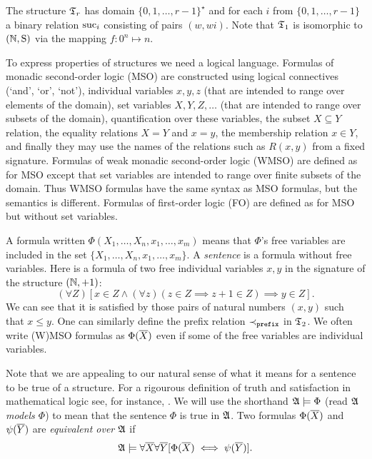 \begin{example}
The structure  $\mathfrak{T}_r$ has domain $\{0,1, \dots,r-1\}^\star$ and for each  $i$ from $\{0,1, \dots, r-1\}$ a binary relation $\text{suc}_i$ consisting of pairs $(w,wi)$. 
Note that $\mathfrak{T}_1$ is isomorphic to $\mbox{$(\mathbb{N},\mathrm{S})$}$ via the mapping $f:0^n \mapsto n$.
\end{example}

To express properties of structures we need a logical language. Formulas of monadic
second-order logic (MSO) are constructed using logical connectives (`and',
`or', `not'), individual variables $x,y,z$ (that are intended to range over
elements of the domain), set variables $X,Y,Z,\dots$ (that are intended to
range over subsets of the domain), quantification over these variables, the
subset $X \subseteq Y$ relation, the equality relations $X = Y$ and $x=y$, the membership relation $x \in Y$, 
and finally they may
use the names of the relations such as $R(x,y)$ from a fixed signature. 
Formulas of weak monadic second-order logic (WMSO) are defined as for MSO
except that set variables are intended to range over finite subsets of the
domain. Thus WMSO formulas have the same syntax as MSO formulas, but the semantics is different.
Formulas of first-order logic (FO) are defined as for MSO but without 
set variables. 

A formula written $\Phi(X_1,\dots,X_n,x_1,\dots,x_m)$ means that $\Phi$'s
free variables are included in the set $\{X_1,\dots,X_n,x_1,\dots,x_m\}$.
A {\em sentence} is a formula without free variables. 
Here is a formula of two free individual variables $x,y$ in the signature of the structure $(\mathbb{N},+1)$:
\[
(\forall Z) [x \in Z \wedge (\forall z)(z \in Z \implies z+1 \in Z) \implies y \in Z].
\]
We can see that it is satisfied by those pairs of natural numbers $(x,y)$ such that $x \leq y$. 
One can similarly define the prefix relation $\prec_{\tt prefix}$ in $\mathfrak{T}_2$. We often write (W)MSO formulas as $\Phi(\mbox{$\overline {X}$})$ even if some of the free
variables are individual variables.

Note that we are appealing to our natural sense of what it means for a
sentence to be true of a structure. 
For a rigourous definition of truth and satisfaction in
mathematical logic see, for instance, \cite{Bool07}. We will use the shorthand $\mathfrak{A} \models \Phi$
(read \emph{$\mathfrak{A}$ models $\Phi$}) to mean that the sentence $\Phi$ is true in
$\mathfrak{A}$. Two formulas $\Phi(\mbox{$\overline {X}$})$ and $\psi(\mbox{$\overline {Y}$})$ are {\em equivalent over $\mathfrak{A}$}
if \[\mathfrak{A} \models \forall \mbox{$\overline {X}$} \forall \mbox{$\overline {Y}$} [\Phi(\mbox{$\overline {X}$}) \iff \psi(\mbox{$\overline {Y}$})].\]

